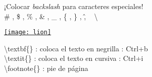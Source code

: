 \begin{frame}
    ¡Colocar \textit{backslash} para caracteres especiales! \\
    \# , \$ , \% , \& , \_ , \{ , \} , \^  , ~ \textbackslash \\
    \begin{flushright}
        \href{https://www.ctan.org/lion/}{\texttt{[image: lion]}} 
    \end{flushright}
    \textbackslash textbf\{\} : coloca el texto en negrilla : Ctrl+b \\
    \textbackslash textit\{\} : coloca el texto en cursiva : Ctrl+i \\
    \textbackslash footnote\{\} : pie de página
    
    
   
\end{frame}